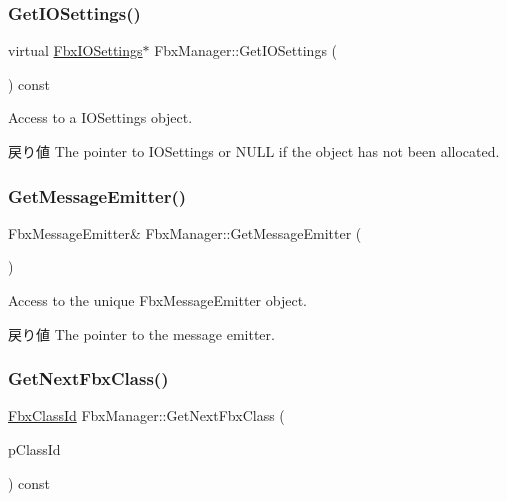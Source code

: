 \subsubsection{\texorpdfstring{Get\+I\+O\+Settings()}{GetIOSettings()}}
{\footnotesize\ttfamily virtual \hyperlink{class_fbx_i_o_settings}{Fbx\+I\+O\+Settings}$\ast$ Fbx\+Manager\+::\+Get\+I\+O\+Settings (\begin{DoxyParamCaption}{ }\end{DoxyParamCaption}) const\hspace{0.3cm}{\ttfamily [virtual]}}

Access to a I\+O\+Settings object. \begin{DoxyReturn}{戻り値}
The pointer to I\+O\+Settings or {\ttfamily N\+U\+LL} {\ttfamily if} the object has not been allocated. 
\end{DoxyReturn}
\mbox{\label{class_fbx_manager_a0803b7fc85be2911a75423e64ccafb4a}} 
\subsubsection{\texorpdfstring{Get\+Message\+Emitter()}{GetMessageEmitter()}}
{\footnotesize\ttfamily Fbx\+Message\+Emitter\& Fbx\+Manager\+::\+Get\+Message\+Emitter (\begin{DoxyParamCaption}{ }\end{DoxyParamCaption})}

Access to the unique Fbx\+Message\+Emitter object. \begin{DoxyReturn}{戻り値}
The pointer to the message emitter. 
\end{DoxyReturn}
\mbox{\label{class_fbx_manager_a979014d6621deb83e5f310b9e5be5a41}} 
\subsubsection{\texorpdfstring{Get\+Next\+Fbx\+Class()}{GetNextFbxClass()}}
{\footnotesize\ttfamily \hyperlink{class_fbx_class_id}{Fbx\+Class\+Id} Fbx\+Manager\+::\+Get\+Next\+Fbx\+Class (\begin{DoxyParamCaption}\item[{\hyperlink{class_fbx_class_id}{Fbx\+Class\+Id}}]{p\+Class\+Id }\end{DoxyParamCaption}) const}

